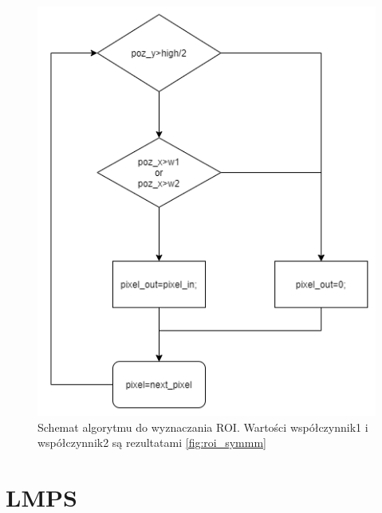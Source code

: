 \begin{figure}[h]
	\centering
	\includegraphics[scale=0.5]{ROI_blockowy.png}
	\caption{Schemat algorytmu do wyznaczania ROI. Wartości współczynnik1 i współczynnik2 są rezultatami \ref{fig:roi_symmm}}
	\label{fig:roi_symm2}
\end{figure}
\section{LMPS}

